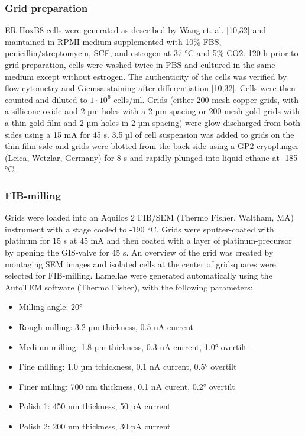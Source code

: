 \documentclass[
]{article}
\providecommand{\tightlist}{%
  \setlength{\itemsep}{0pt}\setlength{\parskip}{0pt}}
\begin{document}
\hypertarget{grid-preparation}{%
\subsubsection{Grid preparation}\label{grid-preparation}}

ER-HoxB8 cells were generated as described by Wang et. al.
{[}\protect\hyperlink{ref-1B9Vt9eYu}{10},\protect\hyperlink{ref-nSMAxqTD}{32}{]}
and maintained in RPMI medium supplemented with 10\% FBS,
penicillin/streptomycin, SCF, and estrogen
 at 37 °C and 5\% CO2. 120 h prior to grid preparation, cells were washed twice in PBS and
cultured in the same medium except without estrogen. The authenticity of the
cells was verified by flow-cytometry and Giemsa staining after differentiation {[}\protect\hyperlink{ref-1B9Vt9eYu}{10},\protect\hyperlink{ref-nSMAxqTD}{32}{]}. Cells were then counted and diluted to \(1\cdot10^6\)
cells/ml. Grids (either 200 mesh copper grids, with a sillicone-oxide
and 2 µm holes with a 2 µm spacing or 200 mesh gold grids with a thin
gold film and 2 µm holes in 2 µm spacing) were glow-discharged from both
sides using a 15 mA for 45 s. 3.5 µl of cell suspension was added to
grids on the thin-film side and grids were blotted from the back side
using a GP2 cryoplunger (Leica, Wetzlar, Germany) for 8 s and rapidly
plunged into liquid ethane at -185 °C.

\hypertarget{fib-milling}{%
\subsubsection{FIB-milling}\label{fib-milling}}

Grids were loaded into an Aquilos 2 FIB/SEM (Thermo Fisher, Waltham, MA)
instrument with a stage cooled to -190 °C. Grids were sputter-coated
with platinum for 15 s at 45 mA and then coated with a layer of
platinum-precursor by opening the GIS-valve for 45 s. An overview of the
grid was created by montaging SEM images and isolated cells at the
center of gridsquares were selected for FIB-milling. Lamellae were
generated automatically using the AutoTEM software (Thermo Fisher), with
the following parameters:

\begin{itemize}
\tightlist
\item
  Milling angle: 20°
\item
  Rough milling: 3.2 µm thickness, 0.5 nA current
\item
  Medium milling: 1.8 µm thickness, 0.3 nA current, 1.0° overtilt
\item
  Fine milling: 1.0 µm tchickness, 0.1 nA current, 0.5° overtilt
\item
  Finer milling: 700 nm thickness, 0.1 nA curent, 0.2° overtilt
\item
  Polish 1: 450 nm thickness, 50 pA current
\item
  Polish 2: 200 nm thickness, 30 pA current
\end{itemize}
\end{document}
